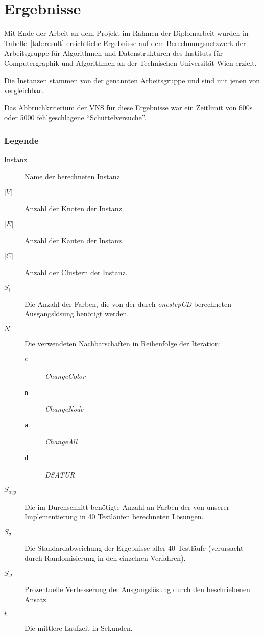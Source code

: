 \appendix

\chapter{Ergebnisse}

Mit Ende der Arbeit an dem Projekt im Rahmen der Diplomarbeit wurden in Tabelle~\ref{tab:result} ersichtliche Ergebnisse auf dem Berechnungsnetzwerk der Arbeitsgruppe für Algorithmen und Datenstrukturen des Instituts für Computergraphik und Algorithmen an der Technischen Universität Wien erzielt.

Die Instanzen stammen von der genannten Arbeitsgruppe und sind mit jenen von \cite{Noronha2006} vergleichbar.

Das Abbruchkriterium der VNS für diese Ergebnisse war ein Zeitlimit von 600s oder 5000 fehlgeschlagene \enquote{Schüttelversuche}.


\subsection*{Legende}

\begin{description}
    \item[Instanz] Name der berechneten Instanz.
    \item[$|V|$] Anzahl der Knoten der Instanz.
    \item[$|E|$] Anzahl der Kanten der Instanz.
    \item[$|C|$] Anzahl der Clustern der Instanz.
    \item[$S_i$] Die Anzahl der Farben, die von der durch \emph{onestepCD} berechneten Ausgangslösung benötigt werden.
    \item[$N$] Die verwendeten Nachbarschaften in Reihenfolge der Iteration:
        \begin{description}
            \item[\texttt{c}] \emph{ChangeColor}
            \item[\texttt{n}] \emph{ChangeNode}
            \item[\texttt{a}] \emph{ChangeAll}
            \item[\texttt{d}] \emph{DSATUR}
        \end{description}
    \item[$S_{avg}$] Die im Durchschnitt benötigte Anzahl an Farben der von unserer Implementierung in 40 Testläufen berechneten Lösungen.
    \item[$S_{\sigma}$] Die Standardabweichung der Ergebnisse aller 40 Testläufe (verursacht durch Ran\-dom\-isier\-ung in den einzelnen Verfahren).
    \item[$S_{\Delta}$] Prozentuelle Verbesserung der Ausgangslösung durch den beschriebenen Ansatz.
    \item[$t$] Die mittlere Laufzeit in Sekunden.
\end{description}


